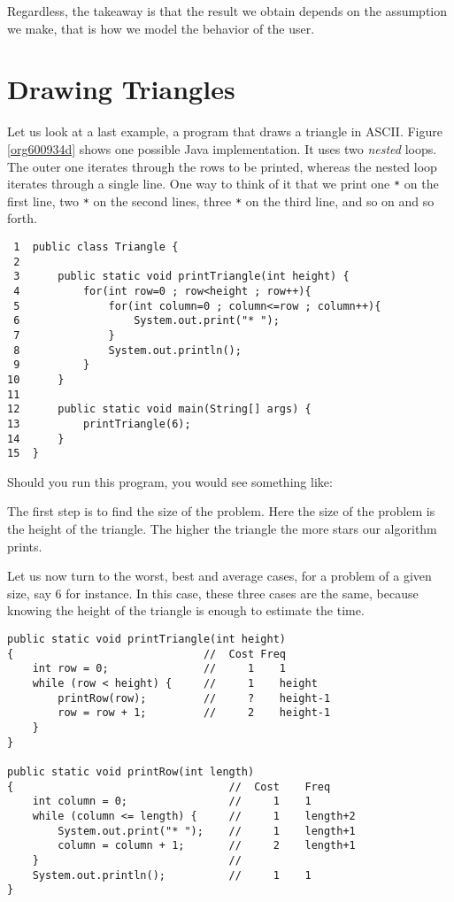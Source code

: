 \documentclass[11pt]{article}
\begin{document}
Regardless, the takeaway is that the result we obtain depends on the
assumption we make, that is how we model the behavior of the user.


\section{Drawing Triangles}
\label{sec:orgc889274}

Let us look at a last example, a program that draws a triangle in
ASCII. Figure \ref{org600934d} shows one possible Java
implementation. It uses two \emph{nested} loops. The outer one iterates
through the rows to be printed, whereas the nested loop iterates
through a single line. One way to think of it that we print one \texttt{*} on
the first line, two \texttt{*} on the second lines, three \texttt{*} on the third
line, and so on and so forth.

\begin{verbatim}
 1  public class Triangle {
 2  
 3      public static void printTriangle(int height) {
 4          for(int row=0 ; row<height ; row++){
 5              for(int column=0 ; column<=row ; column++){
 6                  System.out.print("* ");  
 7              }  
 8              System.out.println();
 9          } 
10      }
11  
12      public static void main(String[] args) {  
13          printTriangle(6);
14      }  
15  }  
\end{verbatim}

Should you run this program, you would see something like:

The first step is to find the size of the problem. Here the size of
the problem is the height of the triangle. The higher the triangle
the more stars our algorithm prints.

Let us now turn to the worst, best and average cases, for a problem of
a given size, say 6 for instance. In this case, these three cases
are the same, because knowing the height of the triangle is enough
to estimate the time.

\begin{verbatim}
public static void printTriangle(int height)
{                              //  Cost Freq
    int row = 0;               //     1    1
    while (row < height) {     //     1    height
        printRow(row);         //     ?    height-1
        row = row + 1;         //     2    height-1 
    }
}

public static void printRow(int length)
{                                  //  Cost    Freq
    int column = 0;                //     1    1
    while (column <= length) {     //     1    length+2
        System.out.print("* ");    //     1    length+1
        column = column + 1;       //     2    length+1
    }                              //
    System.out.println();          //     1    1
}
\end{verbatim}
\end{document}
